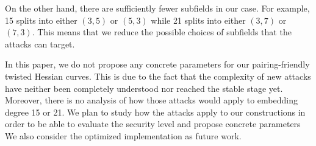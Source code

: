 On the other hand, there are sufficiently fewer subfields in our case.
For example, 15 splits into either $(3,5)$ or $(5,3)$
while 21 splits into either $(3,7)$ or $(7,3)$.
This means that we reduce the possible choices of subfields that the attacks can target.

In this paper, we do not propose any concrete parameters for our pairing-friendly twisted Hessian curves.
This is due to the fact that the complexity of new attacks have neither been completely understood nor reached the stable stage yet.
Moreover, there is no analysis of how those attacks would apply to embedding degree 15 or 21.
We plan to study how the attacks apply to our constructions in order to be able to
evaluate the security level and propose concrete parameters
We also consider the optimized implementation as future work.
